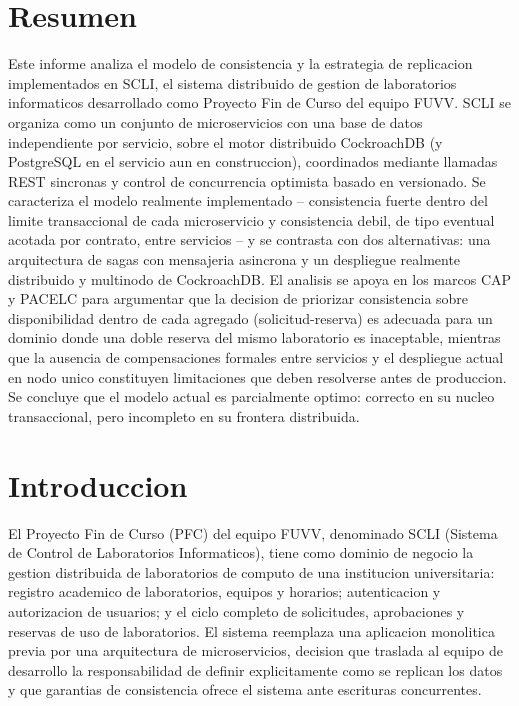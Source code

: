 \documentclass[11pt,a4paper]{article}
\begin{document}
\section*{Resumen}

Este informe analiza el modelo de consistencia y la estrategia de replicacion implementados en SCLI, el sistema distribuido de gestion de laboratorios informaticos desarrollado como Proyecto Fin de Curso del equipo FUVV. SCLI se organiza como un conjunto de microservicios con una base de datos independiente por servicio, sobre el motor distribuido CockroachDB (y PostgreSQL en el servicio aun en construccion), coordinados mediante llamadas REST sincronas y control de concurrencia optimista basado en versionado. Se caracteriza el modelo realmente implementado -- consistencia fuerte dentro del limite transaccional de cada microservicio y consistencia debil, de tipo eventual acotada por contrato, entre servicios -- y se contrasta con dos alternativas: una arquitectura de sagas con mensajeria asincrona y un despliegue realmente distribuido y multinodo de CockroachDB. El analisis se apoya en los marcos CAP y PACELC para argumentar que la decision de priorizar consistencia sobre disponibilidad dentro de cada agregado (solicitud-reserva) es adecuada para un dominio donde una doble reserva del mismo laboratorio es inaceptable, mientras que la ausencia de compensaciones formales entre servicios y el despliegue actual en nodo unico constituyen limitaciones que deben resolverse antes de produccion. Se concluye que el modelo actual es parcialmente optimo: correcto en su nucleo transaccional, pero incompleto en su frontera distribuida.

\newpage
\tableofcontents
\newpage

\section{Introduccion}

El Proyecto Fin de Curso (PFC) del equipo FUVV, denominado SCLI (Sistema de Control de Laboratorios Informaticos), tiene como dominio de negocio la gestion distribuida de laboratorios de computo de una institucion universitaria: registro academico de laboratorios, equipos y horarios; autenticacion y autorizacion de usuarios; y el ciclo completo de solicitudes, aprobaciones y reservas de uso de laboratorios. El sistema reemplaza una aplicacion monolitica previa por una arquitectura de microservicios, decision que traslada al equipo de desarrollo la responsabilidad de definir explicitamente como se replican los datos y que garantias de consistencia ofrece el sistema ante escrituras concurrentes.
\end{document}

